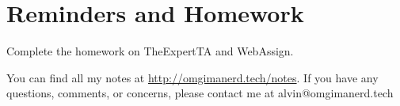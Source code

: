 \documentclass[letterpaper, 12pt]{math}
\begin{document}
\section*{Reminders and Homework}
Complete the homework on TheExpertTA and WebAssign.

\begin{center}
  You can find all my notes at \url{http://omgimanerd.tech/notes}. If you have
  any questions, comments, or concerns, please contact me at
  alvin@omgimanerd.tech
\end{center}
\end{document}
